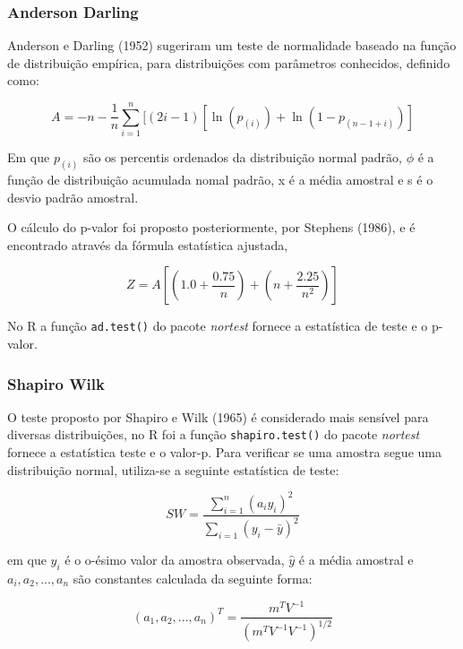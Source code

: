 \documentclass[a4paper,11pt]{article} %
\begin{document}
\subsubsection{Anderson Darling}

Anderson e Darling (1952) sugeriram um teste de normalidade baseado na função de distribuição empírica, para distribuições com parâmetros conhecidos, definido como: 

\begin{equation}
    A = -n - \frac{1}{n} \sum_{i=1}^{n} [(2i-1)[ \ln (p_{(i)}) + \ln(1- p_{(n-1+i)})]
\end{equation}

Em que $p_{(i)}$ são os percentis ordenados da distribuição normal padrão, $\phi$ é a função de distribuição acumulada nomal padrão, x é a média amostral e s é o desvio padrão amostral.\vskip0.3cm

O cálculo do p-valor foi proposto posteriormente, por Stephens (1986), e é encontrado através da fórmula estatística ajustada,

\begin{equation}
    Z = A \left[ \left(1.0 + \frac{0.75}{n} \right)+  \left(n+\frac{2.25}{n^{2}} \right) \right]
\end{equation}


No R a função \texttt{ad.test()} do pacote \textit{nortest} fornece a estatística de teste e o p-valor. \vskip0.3cm

\subsubsection{Shapiro Wilk}

O teste proposto por Shapiro e Wilk (1965) é considerado mais sensível para diversas distribuições, no R foi a função \texttt{shapiro.test()} do pacote \textit{nortest} fornece a estatística teste e o valor-p. Para verificar se uma amostra segue uma distribuição normal, utiliza-se a seguinte estatística de teste: 

\begin{equation}
    SW = \frac{\sum_{i=1}^{n} (a_{i}y_{i})^{2}}{\sum_{i=1}  (y_{i} - \bar{y})^{2}}
\end{equation}

em que $y_{i}$ é o o-ésimo valor da amostra observada, $\hat{y}$ é a média amostral e $a_{i},a_{2},...,a_{n}$ são constantes calculada da seguinte forma:

\begin{equation}
    (a_{1},a_{2},...,a_{n})^{T} = \frac{m^{T}V^{-1}}{(m^{T}V^{-1}V^{-1} )^{1/2}}
\end{equation}
\end{document}
